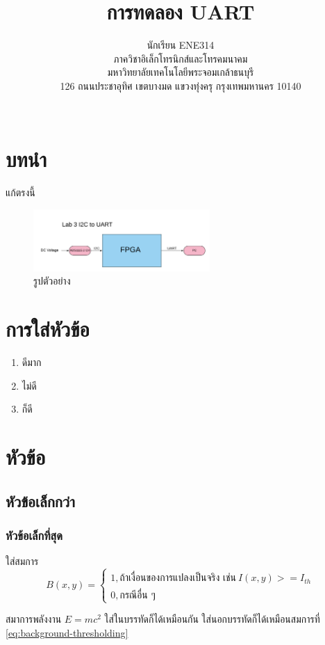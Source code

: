 \documentclass{article}
\title{การทดลอง UART}
\author{
  นักเรียน ENE314 \\
  ภาควิชาอิเล็กโทรนิกส์และโทรคมนาคม\\
  มหาวิทยาลัยเทคโนโลยีพระจอมเกล้าธนบุรี\\
  126 ถนนประชาอุทิศ เขตบางมด แขวงทุ่งครุ กรุงเทพมหานคร 10140 \\
   \\
}
\begin{document}
\maketitle

\section{บทนำ}
แก้ตรงนี้

\begin{figure}[!ht]
\centering
\includegraphics[width=0.6\textwidth]{fig/lab3.png}
\vspace{2em}
\caption{รูปตัวอย่าง}
\label{fig:stamp-real}
\end{figure}

\section{การใส่หัวข้อ}
\begin{enumerate}
\item ดีมาก
\item ไม่ดี 
\item ก็ดี 
\end{enumerate}

\section{หัวข้อ}
\subsection{หัวข้อเล็กกว่า}
\subsubsection{หัวข้อเล็กที่สุด}
ใส่สมการ 
\begin{equation}
B(x,y) = \left\{ \begin{array}{ll}
1, \mbox{ถ้าเงื่อนของการแปลงเป็นจริง เช่น}\ I(x,y) >= I_{th}\\
0, \mbox{กรณีอื่น ๆ}
\end{array}\right. \label{eq:background-thresholding}
\end{equation}

สมาการพลังงาน $E=mc^2$ ใส่ในบรรทัดก็ได้เหมือนกัน
ใส่นอกบรรทัดก็ได้เหมือนสมการที่ \ref{eq:background-thresholding} 



\small


\end{document}
